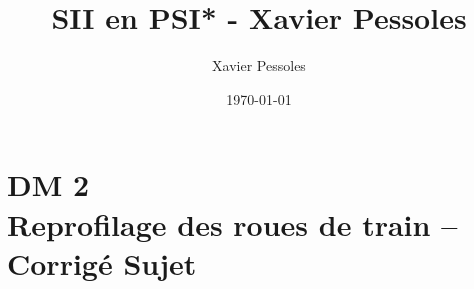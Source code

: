 \documentclass[
	fontsize=10pt, %
	twoside=true, %
]{kaobook}
\newcommand{\repRel}{../../../..}
\newcommand{\repStyle}{\repRel/Style}
\begin{document}

\titlehead{Document Template}
\title[SII en PSI* - Xavier Pessoles]{SII en PSI* - Xavier Pessoles}
\author[XP]{Xavier Pessoles}
\date{\today}

%
\frontmatter %


%
\mainmatter %


\setcounter{margintocdepth}{\sectiontocdepth}
\marginlayout
\graphicspath{{\repStyle/png}}

\pagestyle{xp.scrheadings}



\newcommand{\repExo}{}
\newcommand{\nomExo}{}

\livrettrue %
\collefalse\colletrue
\normaltrue

\newcommand{\exer}{\subsection*}

\chapter*{DM 2 \\ 
Reprofilage des roues de train -- 
\ifprof Corrigé \else Sujet \fi}


\renewcommand{\repExo}{\repRel/Sujets_Concours/2018/CCS_PSI_Tour/}
\renewcommand{\nomExo}{CCS_PSI_Tour_03_dm}

\graphicspath{{\repRel/Style/png/}{\repExo/images/}}

\end{document}
